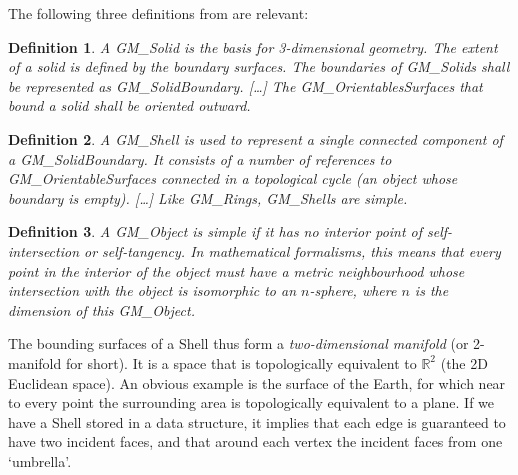 \documentclass[a4paper,parskip=half,11pt]{scrartcl}
\newtheorem{definition}{Definition}
\begin{document}
The following three definitions from \citet{ISO19107} are relevant:
\begin{definition}
A GM\_Solid is the basis for 3-dimensional geometry. 
The extent of a solid is defined by the boundary surfaces.
The boundaries of GM\_Solids shall be represented as GM\_SolidBoundary.
[\ldots] 
The GM\_OrientablesSurfaces that bound a solid shall be oriented outward.
\end{definition}
\begin{definition}
A GM\_Shell is used to represent a single connected component of a GM\_SolidBoundary. 
It consists of a number of references to GM\_OrientableSurfaces connected in a topological cycle (an object whose boundary is empty). 
[\ldots] 
Like GM\_Rings, GM\_Shells are simple.
\end{definition}
\begin{definition}
A GM\_Object is \emph{simple} if it has no interior point of self-intersection or self-tangency. 
In mathematical formalisms, this means that every point in the interior of the object must have a metric neighbourhood whose intersection with the object is isomorphic to an $n$-sphere, where $n$ is the dimension of this GM\_Object.
\end{definition}

The bounding surfaces of a Shell thus form a \emph{two-dimensional manifold} (or 2-manifold for short).
It is a space that is topologically equivalent to $\mathbb{R}^2$ (the 2D Euclidean space).
An obvious example is the surface of the Earth, for which near to every point the surrounding area is topologically equivalent to a plane. 
If we have a Shell stored in a data structure, it implies that each edge is guaranteed to have two incident faces, and that around each vertex the incident faces from one `umbrella'.
\end{document}
